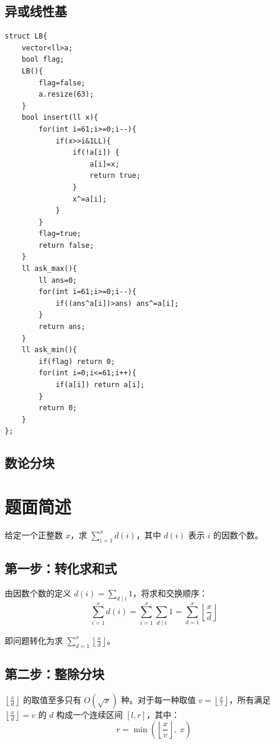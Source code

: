 \documentclass[11pt,a4paper,twocolumn]{ctexart}  %
\begin{document}
\subsection{异或线性基}
\begin{lstlisting}[caption={异或线性基},label={异或线性基}]
struct LB{
    vector<ll>a;
    bool flag;
    LB(){
        flag=false;
        a.resize(63);
    }
    bool insert(ll x){
        for(int i=61;i>=0;i--){
            if(x>>i&1LL){
                if(!a[i]) {
                    a[i]=x;
                    return true;
                } 
                x^=a[i];
            }
        }
        flag=true;
        return false;
    }
    ll ask_max(){
        ll ans=0;
        for(int i=61;i>=0;i--){
            if((ans^a[i])>ans) ans^=a[i];
        }
        return ans;
    }
    ll ask_min(){
        if(flag) return 0;
        for(int i=0;i<=61;i++){
            if(a[i]) return a[i];
        }
        return 0;
    }
};
\end{lstlisting}

\subsection{数论分块}
\section*{题面简述}

给定一个正整数 $x$，求 $\sum_{i=1}^{x} d(i)$，其中 $d(i)$ 表示 $i$ 的因数个数。


\subsection*{第一步：转化求和式}

由因数个数的定义 $d(i) = \sum_{d \mid i} 1$，将求和交换顺序：
\[
    \sum_{i=1}^{x} d(i) = \sum_{i=1}^{x} \sum_{d \mid i} 1 = \sum_{d=1}^{x} \left\lfloor \frac{x}{d} \right\rfloor
\]

即问题转化为求 $\sum_{d=1}^{x} \left\lfloor \frac{x}{d} \right\rfloor$。

\subsection*{第二步：整除分块}

$\left\lfloor \frac{x}{d} \right\rfloor$ 的取值至多只有 $O(\sqrt{x})$ 种。对于每一种取值 $v = \left\lfloor \frac{x}{l} \right\rfloor$，所有满足 $\left\lfloor \frac{x}{d} \right\rfloor = v$ 的 $d$ 构成一个连续区间 $[l, r]$，其中：
\[
    r = \min\!\left(\left\lfloor \frac{x}{v} \right\rfloor,\; x\right)
\]
\end{document}
